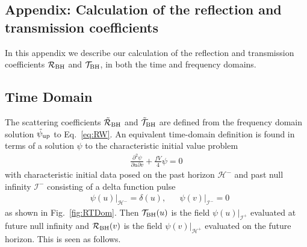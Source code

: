 \begin{refsection}
\section{Appendix: Calculation of the reflection and transmission coefficients}

\label{sec:RTcalc}

In this appendix we describe our calculation of the reflection and transmission coefficients $\mathcal R_{\rm BH}$ and $\mathcal T_{\rm BH}$, in both the time and frequency domains.

\subsection{Time Domain}

The scattering coefficients $\tilde{\mathcal R}_{\rm BH}$ and $\tilde{\mathcal T}_{\rm BH}$ are defined from the frequency domain solution $\tilde \psi_{\rm up}$ to Eq.~\eqref{eq:RW}. 
An equivalent time-domain definition is found in terms of a solution $\psi$ to the characteristic initial value problem 
\begin{align}
\frac{\partial^2 \psi}{\partial u \partial v}+\frac{fV}{4}\psi= 0 \label{eq:psiwave}
\end{align}
with characteristic initial data posed on the past horizon $\mathcal{H}^-$ and past null infinity $\mathcal{I}^-$ consisting of a delta function pulse
\begin{align}
&\left. \psi(u)\right |_{\mathcal{H}^-} =\delta (u),& &\left. \psi(v)\right |_{\mathcal{I}^-}=0
\end{align}
as shown in Fig.~\ref{fig:RTDom}.
Then $\mathcal T_{\rm BH}(u)$ is the field $\psi(u)|_{\mathcal{I}^+}$ evaluated at future null infinity and $\mathcal R_{\rm BH}(v)$ is the field $\left. \psi(v)\right |_{\mathcal{H}^+}$ evaluated on the future horizon.
This is seen as follows.


\end{refsection}

